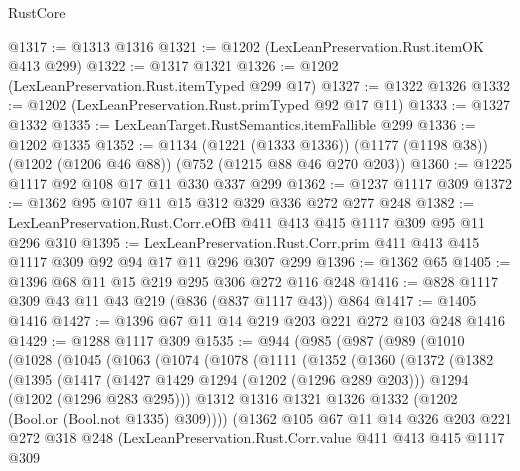 \begin{lexlean}{RustCore}
\begin{coremodule}
@1317 := @1313 @1316
@1321 := @1202 (LexLeanPreservation.Rust.itemOK @413 @299)
@1322 := @1317 @1321
@1326 := @1202 (LexLeanPreservation.Rust.itemTyped @299 @17)
@1327 := @1322 @1326
@1332 := @1202 (LexLeanPreservation.Rust.primTyped @92 @17 @11)
@1333 := @1327 @1332
@1335 := LexLeanTarget.RustSemantics.itemFallible @299
@1336 := @1202 @1335
@1352 := @1134
    (@1221 (@1333 @1336))
    (@1177 (@1198 @38))
    (@1202 (@1206 @46 @88))
    (@752 (@1215 @88 @46 @270 @203))
@1360 := @1225 @1117 @92 @108 @17 @11 @330 @337 @299
@1362 := @1237 @1117 @309
@1372 := @1362 @95 @107 @11 @15 @312 @329 @336 @272 @277 @248
@1382 := LexLeanPreservation.Rust.Corr.eOfB @411 @413 @415 @1117 @309 @95 @11 @296 @310
@1395 := LexLeanPreservation.Rust.Corr.prim @411 @413 @415 @1117 @309 @92 @94 @17 @11 @296 @307 @299
@1396 := @1362 @65
@1405 := @1396 @68 @11 @15 @219 @295 @306 @272 @116 @248
@1416 := @828 @1117 @309 @43 @11 @43 @219 (@836 (@837 @1117 @43)) @864
@1417 := @1405 @1416
@1427 := @1396 @67 @11 @14 @219 @203 @221 @272 @103 @248 @1416
@1429 := @1288 @1117 @309
@1535 := @944
    (@985
      (@987
        (@989
          (@1010
            (@1028
              (@1045
                (@1063
                  (@1074
                    (@1078
                      (@1111
                        (@1352
                          (@1360
                            (@1372
                              (@1382
                                (@1395
                                  (@1417
                                    (@1427 @1429 @1294 (@1202 (@1296 @289 @203)))
                                    @1294
                                    (@1202 (@1296 @283 @295)))
                                  @1312
                                  @1316
                                  @1321
                                  @1326
                                  @1332
                                  (@1202 (Bool.or (Bool.not @1335) @309))))
                              (@1362
                                @105
                                @67
                                @11
                                @14
                                @326
                                @203
                                @221
                                @272
                                @318
                                @248
                                (LexLeanPreservation.Rust.Corr.value
                                  @411
                                  @413
                                  @415
                                  @1117
                                  @309

\end{coremodule}
\end{lexlean}
